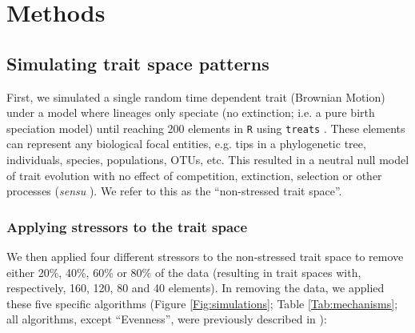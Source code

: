 \documentclass[12pt,letterpaper]{article}
\begin{document}
\section{Methods}
\subsection{Simulating trait space patterns}

First, we simulated a single random time dependent trait (Brownian Motion) under a model where lineages only speciate (no extinction; i.e. a pure birth speciation model) until reaching 200 elements in \texttt{R} \citep{rcore} using \texttt{treats} \citep{guillerme2024treats}.
These elements can represent any biological focal entities, e.g. tips in a phylogenetic tree, individuals, species, populations, OTUs, etc. 
This resulted in a neutral null model of trait evolution with no effect of competition, extinction, selection or other processes (\textit{sensu} \citealt{bausman2018modeling}).
We refer to this as the ``non-stressed trait space''.

\subsubsection{Applying stressors to the trait space}

We then applied four different stressors to the non-stressed trait space to remove either 20\%, 40\%, 60\% or 80\% of the data (resulting in trait spaces with, respectively, 160, 120, 80 and 40 elements).
In removing the data, we applied these five specific algorithms (Figure \ref{Fig:simulations}; Table \ref{Tab:mechanisms}; all algorithms, except ``Evenness'', were previously described in \cite{guillerme2020shifting}):
\end{document}
